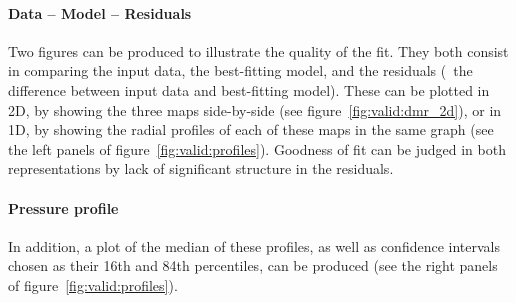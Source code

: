 \paragraph{Data -- Model -- Residuals}
Two figures can be produced to illustrate the quality of the fit.
They both consist in comparing the input data, the best-fitting model, and the residuals (\ie\ the difference between input data and best-fitting model).
These can be plotted in 2D, by showing the three maps side-by-side (see figure~\ref{fig:valid:dmr_2d}), or in 1D, by showing the radial profiles of each of these maps in the same graph (see the left panels of figure~\ref{fig:valid:profiles}).
Goodness of fit can be judged in both representations by lack of significant structure in the residuals.

\paragraph{Pressure profile}
In addition, a plot of the median of these profiles, as well as confidence intervals chosen as their 16th and 84th percentiles, can be produced (see the right panels of figure~\ref{fig:valid:profiles}).
